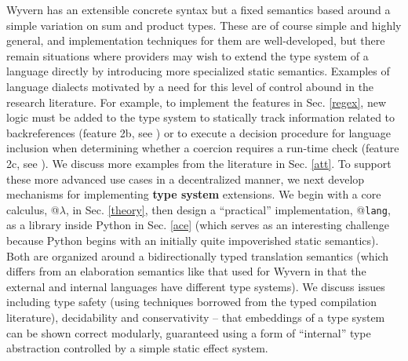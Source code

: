 Wyvern has an extensible concrete syntax but a fixed semantics based around a simple variation on sum and product types. These are of course simple and highly general, and implementation techniques for them are well-developed, but there remain situations where providers may wish to extend the {type system} of a language directly by introducing more specialized static semantics. Examples of language dialects motivated by a need for this level of control abound in the research literature. For example, to implement the features in Sec. \ref{regex}, new logic must be added to the type system to statically track information related to backreferences (feature 2b, see \cite{spishak2012type}) or to execute a decision procedure for language inclusion when determining whether a coercion requires a run-time check (feature 2c, see \cite{fulton-thesis,HosoyaVouillonPierce2000ICFP}). We discuss more examples from the literature in Sec. \ref{att}. To support these more advanced use cases in a decentralized manner, we next develop mechanisms for implementing \textbf{type system} extensions. We begin with a core calculus, @$\lambda$, in Sec. \ref{theory}, then design a ``practical'' implementation, @\verb|lang|, as a library inside Python in Sec. \ref{ace} (which serves as an interesting challenge because Python begins with an initially quite impoverished static semantics). Both are organized around a bidirectionally typed translation semantics (which differs from an elaboration semantics like that used for Wyvern in that the external and internal languages have different type systems). We discuss issues including type safety (using techniques borrowed from the typed compilation literature), decidability and conservativity -- that embeddings of a type system can be shown correct modularly, guaranteed using a form of ``internal'' type abstraction controlled by a simple static effect system. %
